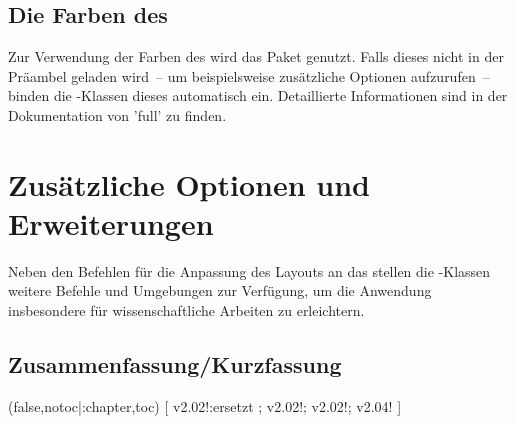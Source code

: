 \begin{DeclareEntity*}{}
\begin{DeclareEntity*}{}
\begin{DeclareEntity*}{}
\subsection{%
  Die Farben des \CDs%
}

Zur Verwendung der Farben des \CDs wird das Paket  
genutzt. Falls dieses nicht in der Präambel geladen wird~-- um beispielsweise 
zusätzliche Optionen aufzurufen~-- binden die \TUDScript-Klassen dieses 
automatisch ein. Detaillierte Informationen sind in der Dokumentation von 
'full' zu finden.%
%



\section{Zusätzliche Optionen und Erweiterungen}

%
Neben den Befehlen für die Anpassung des Layouts an das \TUDCD stellen die 
\TUDScript-Klassen weitere Befehle und Umgebungen zur Verfügung, um die 
Anwendung insbesondere für wissenschaftliche Arbeiten zu erleichtern.



\subsection{%
  Zusammenfassung/Kurzfassung%
}

\begin{Declaration}
  {}
  (false,notoc|:chapter,toc)%
[%
  v2.02!:ersetzt ;%
  v2.02!;%
  v2.02!;%
  v2.04!%
]
\printdeclarationlist


\end{Declaration}
\end{DeclareEntity*}
\end{DeclareEntity*}
\end{DeclareEntity*}
